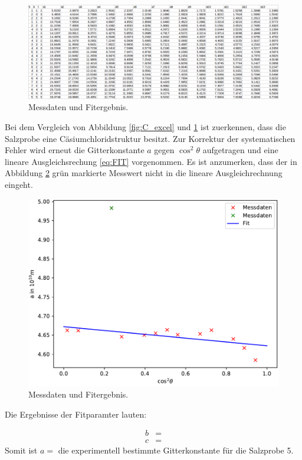 \begin{figure}
	\centering
	\includegraphics[angle=90,scale=0.75]{ressources/Strukturen.png}
	\caption{Messdaten und Fitergebnis.}
    \label{fig:A_excel}
\end{figure}

Bei dem Vergleich von Abbildung \ref{fig:C_excel} und \ref{fig:A_excel} ist zuerkennen, dass die Salzprobe eine Cäsiumchloridstruktur besitzt. Zur Korrektur der systematischen Fehler wird erneut die Gitterkonstante $a$ gegen $\cos^2{\theta}$ aufgetragen und eine lineare Ausgleichsrechung \eqref{eq:FIT} vorgenommen. Es ist anzumerken, dass der in Abbildung \ref{fig:plot5} grün markierte Messwert nicht in die lineare Ausgleichrechnung eingeht.

\begin{figure}
	\centering
	\includegraphics[scale=0.75]{build/Salz.pdf}
	\caption{Messdaten und Fitergebnis.}
    \label{fig:plot5}
\end{figure}

Die Ergebnisse der Fitparamter lauten:

\begin{align}
	b&=  \\
	c&= 
\end{align}
Somit ist $a=$ die experimentell bestimmte Gitterkonstante für die Salzprobe 5.

